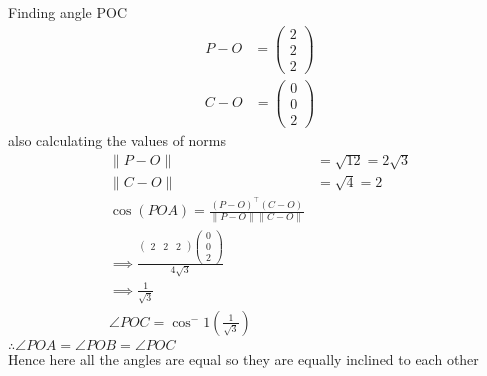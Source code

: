 \documentclass{article}
\newcommand{\norm}[1]{\lVert#1\rVert}
\providecommand{\brak}[1]{\ensuremath{\left(#1\right)}}
\newcommand{\myvec}[1]{\ensuremath{\begin{pmatrix}#1\end{pmatrix}}}
\begin{document}
\begin{enumerate}
Finding angle POC  \\
\begin{align}
	P-O &=\myvec{2\\2\\2}
\end{align}
\begin{align}
	C-O &=\myvec{0\\0\\2}
\end{align}
also calculating the values of norms
\begin{align}
	\norm{P-O} &= \sqrt{12} = 2\sqrt{3} \\
	\norm{C-O} &= \sqrt{4} = 2\\
 \cos{\brak{POA}} = \frac{(P-O)^\top(C-O)}{\norm{P-O}\norm{C-O}}\\
 \implies \frac{\myvec{2&2&2}\myvec{0\\0\\2} }{4\sqrt{3}}\\
 \implies \frac{1}{\sqrt{3}}\\
\angle POC = \cos^-{1}\brak{{\frac{1}{\sqrt{3}}}}
\end{align}
$\therefore \angle POA = \angle POB = \angle POC$ \\
Hence here all the angles are equal so they are equally inclined to each other
\end{enumerate}
\end{document}
